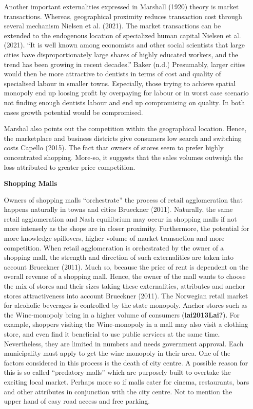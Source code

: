 \documentclass[
  10,
  a4paper,
]{article}
\begin{document}
Another important externalities expressed in Marshall (1920) theory is
market transactions. Whereas, geographical proximity reduces transaction
cost through several mechanism Nielsen et al. (2021). The market
transactions can be extended to the endogenous location of specialized
human capital Nielsen et al. (2021). ``It is well known among economists
and other social scientists that large cities have disproportionately
large shares of highly educated workers, and the trend has been growing
in recent decades.'' Baker (n.d.) Presumably, larger cities would then
be more attractive to dentists in terms of cost and quality of
specialised labour in smaller towns. Especially, those trying to achieve
spatial monopoly end up loosing profit by overpaying for labour or in
worst case scenario not finding enough dentists labour and end up
compromising on quality. In both cases growth potential would be
compromised.

Marshal also points out the competition within the geographical
location. Hence, the marketplace and business districts give consumers
low search and switching costs Capello (2015). The fact that owners of
stores seem to prefer highly concentrated shopping. More-so, it suggests
that the sales volumes outweigh the loss attributed to greater price
competition.

\textbf{Shopping Malls}

Owners of shopping malls ``orchestrate'' the process of retail
agglomeration that happens naturally in towns and cities Brueckner
(2011). Naturally, the same retail agglomeration and Nash equilibrium
may occur in shopping malls if not more intensely as the shops are in
closer proximity. Furthermore, the potential for more knowledge
spillovers, higher volume of market transaction and more competition.
When retail agglomeration is orchestrated by the owner of a shopping
mall, the strength and direction of such externalities are taken into
account Brueckner (2011). Much so, because the price of rent is
dependent on the overall revenue of a shopping mall. Hence, the owner of
the mall wants to choose the mix of stores and their sizes taking these
externalities, attributes and anchor stores attractiveness into account
Brueckner (2011). The Norwegian retail market for alcoholic beverages is
controlled by the state monopoly. Anchor-stores such as the
Wine-monopoly bring in a higher volume of consumers
(\textbf{lai2013Lai?}). For example, shoppers visiting the Wine-monopoly
in a mall may also visit a clothing store, and even find it beneficial
to use public services at the same time. Nevertheless, they are limited
in numbers and needs government approval. Each municipality must apply
to get the wine monopoly in their area. One of the factors considered in
this process is the death of city centre. A possible reason for this is
so called ``predatory malls'' which are purposely built to overtake the
exciting local market. Perhaps more so if malls cater for cinema,
restaurants, bars and other attributes in conjunction with the city
centre. Not to mention the upper hand of easy road access and free
parking.
\end{document}
